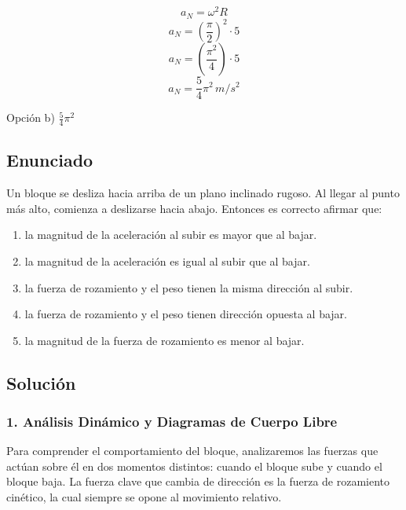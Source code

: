 \documentclass[12pt, a4paper]{article}
\begin{document}
$$a_N = \omega^2 R$$
$$a_N = \left( \frac{\pi}{2} \right)^2 \cdot 5$$
$$a_N = \left( \frac{\pi^2}{4} \right) \cdot 5$$
$$a_N = \frac{5}{4}\pi^2 \, \si{m/s^2}$$

\begin{tcolorbox}[colback=green!5!white, colframe=green!50!black, title=Respuesta Final]
\centering Opción b) $\frac{5}{4}\pi^2$
\end{tcolorbox}

\newpage

\subsection*{Enunciado}
Un bloque se desliza hacia arriba de un plano inclinado rugoso. Al llegar al punto más alto, comienza a deslizarse hacia abajo. Entonces es correcto afirmar que:
\begin{enumerate}[label=\alph*)]
    \item la magnitud de la aceleración al subir es mayor que al bajar.
    \item la magnitud de la aceleración es igual al subir que al bajar.
    \item la fuerza de rozamiento y el peso tienen la misma dirección al subir.
    \item la fuerza de rozamiento y el peso tienen dirección opuesta al bajar.
    \item la magnitud de la fuerza de rozamiento es menor al bajar.
\end{enumerate}

\subsection*{Solución}

\subsubsection*{1. Análisis Dinámico y Diagramas de Cuerpo Libre}
Para comprender el comportamiento del bloque, analizaremos las fuerzas que actúan sobre él en dos momentos distintos: cuando el bloque sube y cuando el bloque baja. La fuerza clave que cambia de dirección es la fuerza de rozamiento cinético, la cual siempre se opone al movimiento relativo.
\end{document}

